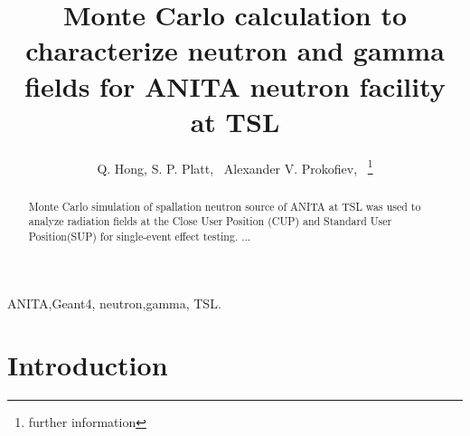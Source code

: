 \documentclass[12pt,journal]{IEEEtran}
\begin{document}
\title{\vspace{-15mm}\fontsize{24pt}{10pt}\selectfont\textbf{Monte Carlo calculation to characterize neutron and gamma fields for ANITA neutron facility at TSL}} 	%

\author{Q. Hong, 
S. P. Platt,~
Alexander V. Prokofiev,~
\thanks{further information}\\[2mm] 	%
\vspace{-5mm}
}



\maketitle %


\begin{abstract}
Monte Carlo simulation of spallation neutron source of ANITA at TSL was used to analyze radiation fields at the Close User Position (CUP) and Standard User Position(SUP) for single-event effect testing. ...
\end{abstract}

\begin{IEEEkeywords}
ANITA,Geant4, neutron,gamma, TSL.
\end{IEEEkeywords}


\IEEEpeerreviewmaketitle

\section{Introduction}
\end{document}

